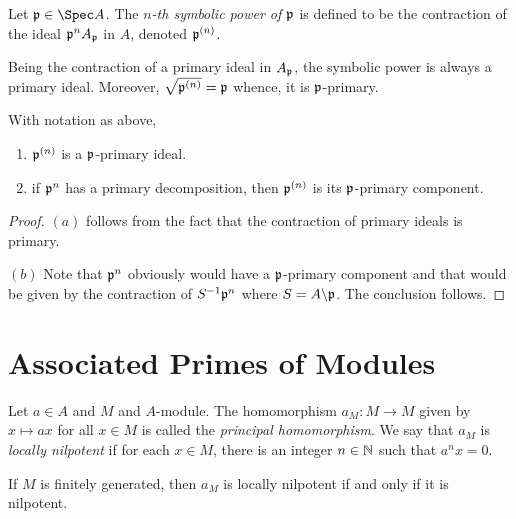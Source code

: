 \begin{definition}
    Let $\frakp\in\Spec A$. The \emph{$n$-th symbolic power of $\mathfrak p$} is defined to be the contraction of the ideal $\mathfrak p^nA_\mathfrak p$ in $A$, denoted $\mathfrak p^{(n)}$.
\end{definition}

Being the contraction of a primary ideal in $A_\mathfrak p$, the symbolic power is always a primary ideal. Moreover, $\sqrt{\mathfrak p^{(n)}} = \mathfrak p$ whence, it is $\mathfrak p$-primary.

\begin{proposition}
    With notation as above, 
    \begin{enumerate}[label=(\alph*)]
        \item $\mathfrak p^{(n)}$ is a $\mathfrak p$-primary ideal. 
        \item if $\mathfrak p^n$ has a primary decomposition, then $\mathfrak p^{(n)}$ is its $\mathfrak p$-primary component.
    \end{enumerate}
\end{proposition}
\begin{proof}
    $(a)$ follows from the fact that the contraction of primary ideals is primary. 

    $(b)$ Note that $\mathfrak p^n$ obviously would have a $\mathfrak p$-primary component and that would be given by the contraction of $S^{-1}\mathfrak p^n$ where $S = A\backslash\mathfrak p$. The conclusion follows.
\end{proof}

\section{Associated Primes of Modules}

\begin{definition}
    Let $a\in A$ and $M$ and $A$-module. The homomorphism $a_M: M\to M$ given by $x\mapsto ax$ for all $x\in M$ is called the \emph{principal homomorphism}. We say that $a_M$ is \emph{locally nilpotent} if for each $x\in M$, there is an integer $n\in\mathbb{N}$ such that $a^n x = 0$.
\end{definition}

\begin{remark}
    If $M$ is finitely generated, then $a_M$ is locally nilpotent if and only if it is nilpotent.
\end{remark}

